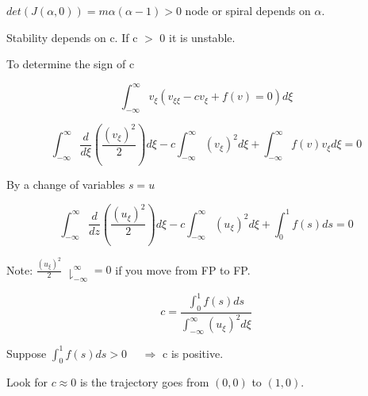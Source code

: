 \documentclass[]{article}
\numberwithin{equation}{section}		%
\begin{document}
$det(J(\alpha,0))=m\alpha(\alpha-1) > 0$ node or spiral depends on $\alpha$.

Stability depends on c. If c $>$ 0 it is unstable.


To determine the sign of c

\begin{equation}
\int_{-\infty}^{\infty} v_\xi(v_{\xi\xi}-cv_\xi+f(v)=0)d\xi \nonumber
\end{equation}

\begin{equation}
\int_{-\infty}^{\infty} \frac{d}{d\xi}(\frac{(v_\xi)^2}{2})d\xi-c\int_{-\infty}^{\infty}(v_\xi)^{2}d\xi+\int_{-\infty}^{\infty} f(v)v_\xi d\xi=0 \nonumber
\end{equation}


By a change of variables $s=u$


\begin{equation}
\int_{-\infty}^{\infty}\frac{d}{dz}(\frac{(u_\xi)^{2}}{2})d\xi-c\int_{-\infty}^{\infty}(u_\xi)^{2}d\xi+\int_{0}^{1}f(s)ds=0 \nonumber
\end{equation}


\indent Note: $\frac{(u_\xi)^{2}}{2}$ $\downharpoonright_{-\infty}^{\infty}=0$ if you move from FP to FP.


\begin{equation}
c=\unit{\frac{\int_{0}^{1}f(s)ds}{\int_{-\infty}^{\infty}(u_\xi)^{2}d\xi}} \nonumber
\end{equation}


Suppose $\int_0^1 f(s) ds > 0$ \ \ $ \Rightarrow$ c is positive.

Look for $c\approx0$ is the trajectory goes from $(0,0)$ to $(1,0)$.
\end{document}
